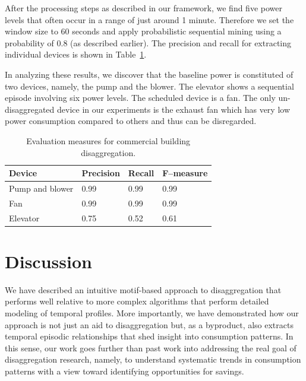 After the processing steps as described in our framework, we find five power
levels that often occur in a range of just around 1 minute.
Therefore we set the window size to 60 seconds and apply
probabilistic sequential mining using a probability of 0.8 (as described
earlier).
The precision and recall for extracting individual devices is shown in Table~\ref{tab_comm}.

%
In analyzing these results, we discover that
the baseline power is constituted of two devices, namely,
the pump and the blower.
The elevator shows a sequential episode involving six power levels.
The scheduled device is a fan.
The only un-disaggregated device in our experiments is the exhaust fan
which has very low power consumption compared to others and thus can be disregarded.

\begin{table}
 \centering
\caption {Evaluation measures for commercial building disaggregation.} \label{tab_comm}
\begin{tabular} {|l|l|l|l|}
\hline
Device& Precision & Recall &F--measure\\
\hline
Pump and blower & 0.99 & 0.99 & 0.99 \\
Fan  & 0.99 & 0.99 & 0.99 \\
Elevator & 0.75 & 0.52 & 0.61  \\
\hline
\end{tabular}
\end{table}

%
\section{Discussion}
We have described an intuitive motif-based approach to disaggregation that performs
well relative to more complex algorithms that perform detailed modeling of temporal
profiles.
More importantly,
we have demonstrated how our approach is not just an aid to disaggregation
but, as a byproduct, also extracts temporal episodic relationships that shed
insight into consumption patterns. In this sense, our work goes further
than past work into addressing the real goal of disaggregation research,
namely, to understand systematic trends in consumption patterns with a view
toward identifying opportunities for savings.



%
%

